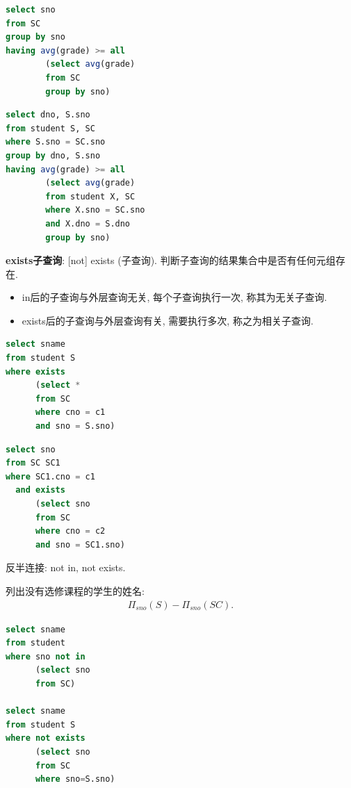 \begin{lstlisting}[language=SQL, caption={找出平均成绩最高的学生号}]
select sno
from SC
group by sno
having avg(grade) >= all
        (select avg(grade)
        from SC
        group by sno)
\end{lstlisting}

\begin{lstlisting}[language=SQL, caption={找出每个系平均成绩最高的学生}]
select dno, S.sno
from student S, SC
where S.sno = SC.sno
group by dno, S.sno
having avg(grade) >= all
        (select avg(grade)
        from student X, SC
        where X.sno = SC.sno
        and X.dno = S.dno
        group by sno)
\end{lstlisting}

\textbf{exists子查询}: [not] exists (子查询). 判断子查询的结果集合中是否有任何元组存在.

\begin{itemize}
  \item in后的子查询与外层查询无关, 每个子查询执行一次, 称其为无关子查询.
  \item exists后的子查询与外层查询有关, 需要执行多次, 称之为相关子查询.
\end{itemize}

\begin{lstlisting}[language=SQL, caption={列出选修了c1号课程的学生姓名}]
select sname
from student S
where exists
      (select *
      from SC
      where cno = c1
      and sno = S.sno)
\end{lstlisting}

\begin{lstlisting}[language=SQL, caption={列出选修了c1号和c2号课程的学生的学号}]
select sno
from SC SC1
where SC1.cno = c1
  and exists
      (select sno
      from SC
      where cno = c2
      and sno = SC1.sno)
\end{lstlisting}

反半连接: not in, not exists.

列出没有选修课程的学生的姓名:
\begin{align*}
    \Pi_{sno}(S)-\Pi_{sno}(SC).
\end{align*}

\begin{lstlisting}[language=SQL]
select sname
from student
where sno not in
      (select sno
      from SC)

select sname
from student S
where not exists
      (select sno
      from SC
      where sno=S.sno)
\end{lstlisting}


